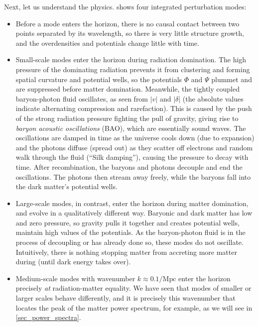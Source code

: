 \documentclass[10pt,a4paper]{article}
\begin{document}
Next, let us understand the physics.
 shows four integrated perturbation modes:
\begin{itemize}
\item
Before a mode enters the horizon,
there is no causal contact between two points separated by its wavelength,
so there is very little structure growth, and the overdensities and potentials change little with time.

\item
Small-scale modes enter the horizon during radiation domination.
The high pressure of the dominating radiation prevents it from clustering and forming spatial curvature and potential wells,
so the potentials $\Phi$ and $\Psi$ plummet and are suppressed before matter domination.
Meanwhile, the tightly coupled baryon-photon fluid oscillates, as seen from $|v|$ and $|\delta|$ (the absolute values indicate alternating compression and rarefaction).
This is caused by the push of the strong radiation pressure fighting the pull of gravity, giving rise to \emph{baryon acoustic oscillations} (BAO), which are essentially sound waves.
The oscillations are damped in time as the universe cools down (due to expansion) and the photons diffuse (spread out) as they scatter off electrons and random walk through the fluid (``Silk damping''), causing the pressure to decay with time.
After recombination, the baryons and photons decouple and end the oscillations.
The photons then stream away freely, while the baryons fall into the dark matter's potential wells.

\item
Large-scale modes, in contrast, enter the horizon during matter domination, and evolve in a qualitatively different way.
Baryonic and dark matter has low and zero pressure,
so gravity pulls it together and creates potential wells, maintain high values of the potentials.
As the baryon-photon fluid is in the process of decoupling or has already done so, these modes do not oscillate.
Intuitively, there is nothing stopping matter from accreting more matter during (until dark energy takes over).

\item
Medium-scale modes with wavenumber $k \approx 0.1 / \textrm{Mpc}$ enter the horizon precisely \emph{at} radiation-matter equality.
We have seen that modes of smaller or larger scales behave differently,
and it is precisely this wavenumber that locates the peak of the matter power spectrum, for example,
as we will see in \cref{sec_power_spectra}.


\end{itemize}
\end{document}

